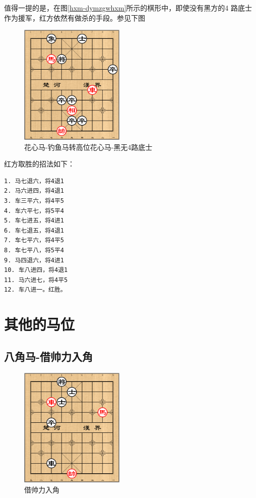 \documentclass[a5paper,twoside]{book}
\begin{document}
值得一提的是，在图\ref{hxm-dymzgwhxm}所示的棋形中，即使没有黑方的4
路底士作为援军，红方依然有做杀的手段。参见下图

\begin{figure}[H]
\centering
\includegraphics[width=5cm]{pic/花心马-钓鱼马转高位花心马-黑无4路底士.png}
\caption{花心马-钓鱼马转高位花心马-黑无4路底士}
\end{figure}

红方取胜的招法如下：

\begin{verbatim}
1. 马七退六，将4退1
2. 马六进四，将4退1
3. 车三平六，将4平5
4. 车六平七，将5平4
5. 车七进五，将4进1
6. 车七退五，将4退1
7. 车七平六，将4平5
8. 车七平八，将5平4
9. 马四退六，将4进1
10. 车八进四，将4退1
11. 马六进七，将4平5
12. 车八进一。红胜。
\end{verbatim}




\chapter{其他的马位}
\label{sec-6}
\section{八角马-借帅力入角}
\label{sec-6-1}
\begin{figure}[H]
\centering
\includegraphics[width=5cm]{pic/借帅力入角.png}
\caption{借帅力入角}
\end{figure}
\end{document}
